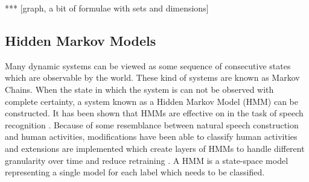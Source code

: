 *** [graph, a bit of formulae with sets and dimensions]




\subsection{Hidden Markov Models}
Many dynamic systems can be viewed as some sequence of consecutive states 
which are observable by the world. These kind of systems are known as Markov 
Chains. When the state in which the system is can not be observed with 
complete certainty, a system known as a Hidden Markov Model (HMM) can be 
constructed. It has been shown that HMMs are effective on in the task of 
speech recognition \cite{rabiner1989tutorial}. Because of some resemblance 
between natural speech construction and human activities, modifications have 
been able to classify human activities \cite{guenterberg2009distributed} and 
extensions are implemented which create layers of HMMs to handle different 
granularity over time and reduce retraining 
\cite{oliver2002layered,perdikis2008recognition}. A HMM is a state-space model 
representing a single model for each label which needs to be classified.

